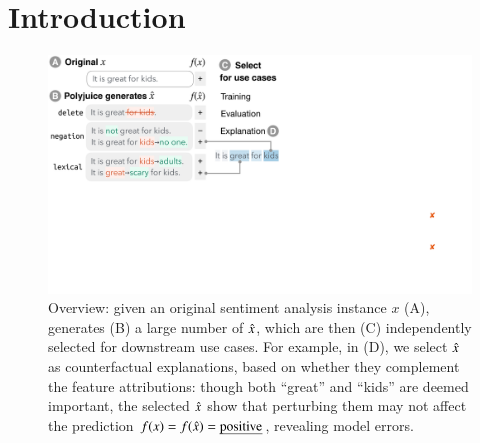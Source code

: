 \section{Introduction}
\label{sec:intro}

\begin{figure}[t]
\centering
\includegraphics[trim={0 18cm 30.5cm 0cm},clip, width=1\columnwidth]{figures/teaser.pdf}
\vspace{-15pt}
\caption{
Overview: given an original sentiment analysis instance $x$ (A), \sysname generates (B) a large number of $\hat{x}$, which are then (C) independently selected for downstream use cases.
For example, in (D), we select $\hat{x}$ as counterfactual explanations, based on whether they complement the feature attributions: though both ``great'' and ``kids'' are deemed important, the selected $\hat{x}$ show that perturbing them may not affect the prediction $f(x)=f(\hat{x})=\text{\emph{positive}}$, revealing model errors.
}
\vspace{-15pt}
\label{fig:teaser}
\end{figure} 
 

